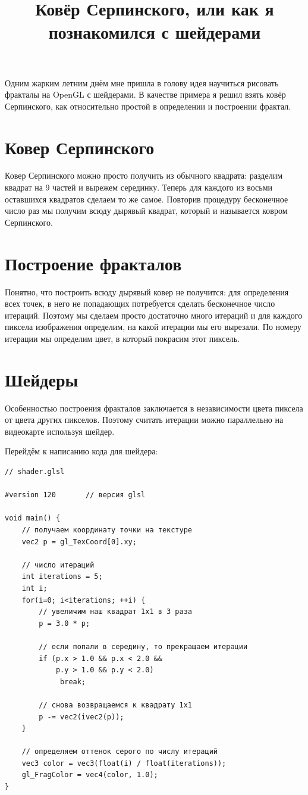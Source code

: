 

\title{Ковёр Серпинского, или как я познакомился с шейдерами}


\maketitle
\tableofcontents
Одним жарким летним днём мне пришла в голову идея научиться рисовать фракталы на OpenGL с шейдерами. В качестве примера я решил взять ковёр Серпинского, как относительно простой в определении и построении фрактал.

\section{Ковер Серпинского}

Ковер Серпинского можно просто получить из обычного квадрата: разделим квадрат на 9 частей и вырежем серединку. Теперь для каждого из восьми оставшихся квадратов сделаем то же самое. Повторив процедуру бесконечное число раз мы получим всюду дырявый квадрат, который и называется ковром Серпинского.


\section{Построение фракталов}

Понятно, что построить всюду дырявый ковер не получится: для определения всех точек, в него не попадающих потребуется сделать бесконечное число итераций. Поэтому мы сделаем просто достаточно много итераций и для каждого пиксела изображения определим, на какой итерации мы его вырезали. По номеру итерации мы определим цвет, в который покрасим этот пиксель.

\section{Шейдеры}

Особенностью построения фракталов заключается в независимости цвета пиксела от цвета других пикселов. Поэтому считать итерации можно параллельно на видеокарте используя шейдер.

Перейдём к написанию кода для шейдера:

\begin{lstlisting}
// shader.glsl

#version 120       // версия glsl

void main() {
    // получаем координату точки на текстуре
    vec2 p = gl_TexCoord[0].xy;

    // число итераций
    int iterations = 5;
    int i;
    for(i=0; i<iterations; ++i) {
        // увеличим наш квадрат 1х1 в 3 раза
        p = 3.0 * p;

        // если попали в середину, то прекращаем итерации
        if (p.x > 1.0 && p.x < 2.0 &&
            p.y > 1.0 && p.y < 2.0)
             break;

        // снова возвращаемся к квадрату 1x1
        p -= vec2(ivec2(p));
    }

    // определяем оттенок серого по числу итераций
    vec3 color = vec3(float(i) / float(iterations));
    gl_FragColor = vec4(color, 1.0);
}
\end{lstlisting}

